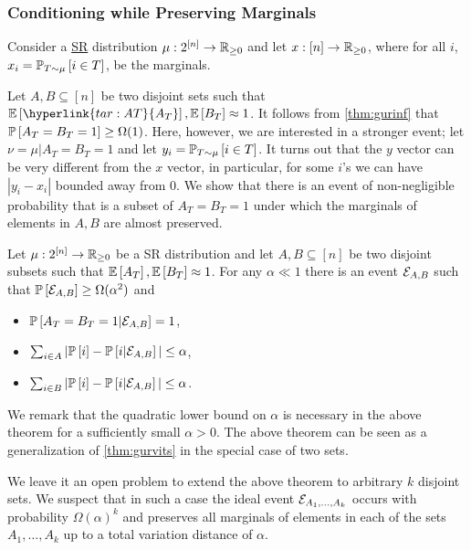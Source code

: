 \subsubsection{Conditioning while Preserving Marginals}
\label{sec:marginals}
Consider a \hyperlink{tar:SR}{SR} distribution $\mu:2^{[n]}\to\R_{\geq 0}$ and let $x:[n]\to\R_{\geq 0}$, where for all $i$, $x_i=\PP{T\sim\mu}{i\in T}$, be the marginals. 

Let $A,B\subseteq [n]$ be two disjoint sets such that $\E{\hyperlink{tar:AT}{A_T}},\E{B_T}\approx 1$. It follows from \cref{thm:gurinf} that $\P{A_T=B_T=1}\geq \Omega(1)$. Here, however, we are interested in a stronger event; let $\nu = \mu | A_T=B_T=1$ and let $y_i=\PP{T\sim\mu}{i\in T}$. It turns out that the $y$ vector can be very different from the $x$ vector, in particular, for some $i$'s we can have $|y_i-x_i|$ bounded away from $0$. We show that there is an event of non-negligible probability that is a subset of $A_T=B_T=1$ under which the marginals of elements in $A,B$ are almost preserved. 
\begin{theorem}
Let $\mu:2^{[n]}\to\R_{\geq 0}$ be a SR distribution and let $A,B\subseteq [n]$ be two disjoint subsets such that $\E{A_T},\E{B_T}\approx 1$. For any $\alpha\ll 1$ there is an event $\cE_{A,B}$ such that $\P{\cE_{A,B}}\geq \Omega(\alpha^2)$ and
\begin{itemize}
\item $\P{A_T=B_T=1 | \cE_{A,B}}=1$,
\item $\sum_{i\in A} |\P{i} - \P{i | \cE_{A,B}}| \leq \alpha$,
\item $\sum_{i\in B} |\P{i} - \P{i | \cE_{A,B}}| \leq \alpha$.
\end{itemize}
\end{theorem}
We remark that the quadratic lower bound on $\alpha$ is necessary in the above theorem for a sufficiently small $\alpha>0$.
The above theorem can be seen as a generalization of \cref{thm:gurvits} in the special case of two sets.

We leave it an open problem to extend the above theorem to arbitrary $k$ disjoint sets. We suspect that in such a case the ideal event $\cE_{A_1,\dots,A_k}$ occurs with probability $\Omega(\alpha)^k$ and preserves all marginals of elements in each of the sets $A_1,\dots,A_k$ up to a total variation distance of $\alpha$.





